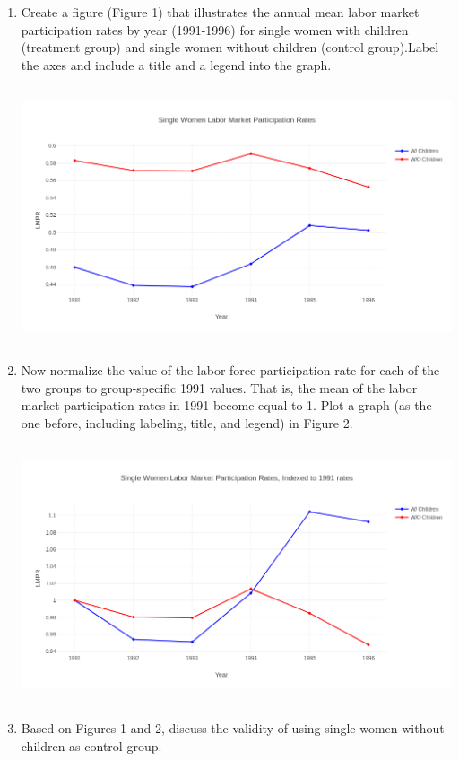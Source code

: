 \documentclass{article}
\begin{document}
\begin{enumerate}[label=\alph*]
\item  Create a figure (Figure 1) that illustrates the annual mean labor market participation rates by year (1991-1996) for single women with children (treatment group) and single women without children (control group).Label the axes and include a title and a legend into the graph.

\includegraphics[width=5in, height=3in]{newplot}

\item Now normalize the value of the labor force participation rate for each of the two groups to group-specific 1991 values. That is, the mean of the labor  market participation rates in 1991 become equal to 1. Plot a graph (as the one before, including labeling, title, and legend) in Figure 2.

\includegraphics[width=5in, height=3in]{figure2}

\item  Based on Figures 1 and 2, discuss the validity of using single women without children as control group.


\end{enumerate}
\end{document}

